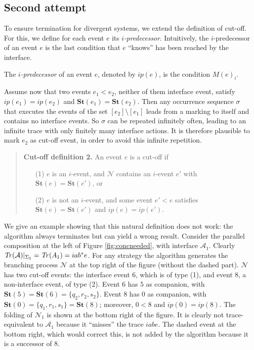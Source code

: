 \documentclass{llncs}
\def\A{\mathcal{A}}
\def\N{\mathcal{N}}
\newcommand{\st}[1]{\mathbf{St}(#1)}
\newcommand{\Tr}[1]{{\it Tr}(#1)}
\begin{document}
\subsection{Second attempt} 
To ensure termination for divergent systems, we extend the definition of cut-off. For this, we define for each event $e$ its {\em $i$-predecessor}. Intuitively, the $i$-predecessor of an event $e$ is the last condition that $e$ ``knows'' has been
reached by the interface. 

\begin{definition}
The 
{\em $i$-predecessor} of an event $e$, denoted by $ip(e)$, is the condition $M(e)_i$.
\end{definition}

Assume now that two events $e_1 < e_2$, neither of them interface event, satisfy $ip(e_1)=ip(e_2)$
and $\st{e_1}=\st{e_2}$. Then any occurrence sequence $\sigma$ that executes 
the events of the set $[e_2] \setminus [e_1]$ leads from a marking to itself and 
contains no interface events. So $\sigma$ can be repeated infinitely often,
leading to an infinite trace with only finitely many interface actions. It is therefore
plausible to mark $e_2$ as cut-off event, in order to avoid this infinite repetition.

\begin{quote}
{\bf Cut-off definition 2.} An event $e$ is a cut-off if 
\begin{enumerate}
\item[(1)] $e$ is an $i$-event, and $\N$ contains an $i$-event $e'$ with $\st{e}=\st{e'}$, or
\item[(2)] $e$ is not an $i$-event, and some event $e'< e$ satisfies $\st{e}=\st{e'}$ and $ip(e)=ip(e')$.
\end{enumerate}
\end{quote}

We give 
an example showing that this natural definition does not work: the algorithm always terminates
but can yield a wrong result. Consider the parallel composition at the left of
Figure \ref{fig:concneeded}, with interface $\A_1$. Clearly
$\Tr{\A}|_{\Sigma_1} = \Tr{A_1} = iab^*e$. For any strategy the algorithm generates the branching 
process $\N$ at the top right of the figure (without the dashed part). $\N$ has two cut-off events: the interface event $6$,
which is of type (1), and event $8$, a non-interface event, of type (2). Event $6$ has $5$ as companion,
with $\st{5}=\st{6}= \{q_2,r_2,s_2\}$. Event $8$ has $0$ as companion, with $\st{0}=\{q_1,r_1,s_1\}=\st{8}$;
moreover, $0 < 8$ and $ip(0) = ip(8)$. The folding of $\N_1$ 
is shown at the bottom right of the figure.
It is clearly not trace-equivalent to $\A_1$ because it ``misses'' the trace 
$iabe$. The dashed event at the bottom right, which would correct this,
is not added by the algorithm because it is a successor of $8$. 
\end{document}
